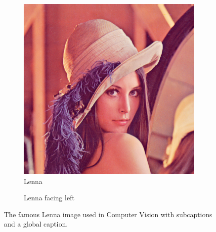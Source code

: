 \label{sub:figures}
\begin{figure}[ht]
	\begin{center}
		\begin{subfigure}[b]{0.49\textwidth}
			\includegraphics[width=\textwidth]{thesis-template-master/images/lenna.png}
			\caption{Lenna}
			\label{fig:lenna}
		\end{subfigure}
		\begin{subfigure}[b]{0.49\textwidth}
			\caption{Lenna facing left}
			\label{fig:lenna_facing_left}
		\end{subfigure}
	\end{center}
	\caption{The famous Lenna image used in Computer Vision with subcaptions and a global caption.}
	\label{fig:lennas}
\end{figure}
